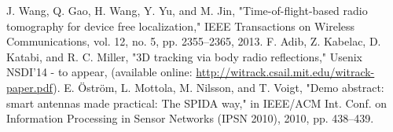 \documentclass[conference]{IEEEtran}
\begin{document}
\begin{thebibliography}{49}
 J. Wang, Q. Gao, H. Wang, Y. Yu, and M. Jin, "Time-of-flight-based radio tomography for device free localization," IEEE Transactions on Wireless Communications, vol. 12, no. 5, pp. 2355--2365, 2013.
 F. Adib, Z. Kabelac, D. Katabi, and R. C. Miller, "3D tracking via body radio reflections," Usenix NSDI'14 - to appear, (available online: \url{http://witrack.csail.mit.edu/witrack-paper.pdf}).
 E. \"Ostr\"om, L. Mottola, M. Nilsson, and T. Voigt, "Demo abstract: smart antennas made practical: The SPIDA way," in IEEE/ACM Int. Conf. on Information Processing in Sensor Networks (IPSN 2010), 2010, pp. 438--439.

\end{thebibliography}
\end{document}

